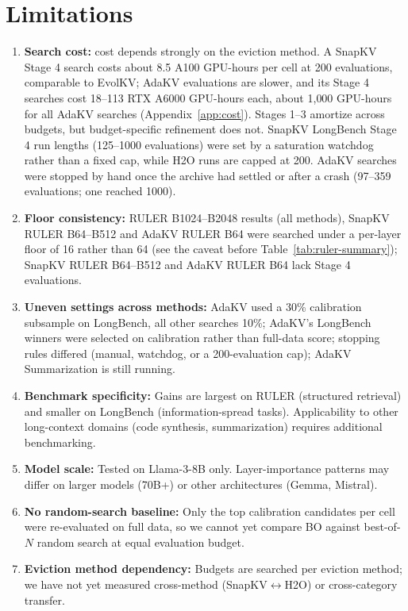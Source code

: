 \documentclass[11pt]{article}
\begin{document}
\section{Limitations}

\begin{enumerate}
\item \textbf{Search cost:} cost depends strongly on the eviction method. A SnapKV Stage 4 search costs about 8.5 A100 GPU-hours per cell at 200 evaluations, comparable to EvolKV; AdaKV evaluations are slower, and its Stage 4 searches cost 18--113 RTX A6000 GPU-hours each, about 1{,}000 GPU-hours for all AdaKV searches (Appendix~\ref{app:cost}). Stages 1--3 amortize across budgets, but budget-specific refinement does not. SnapKV LongBench Stage 4 run lengths (125--1000 evaluations) were set by a saturation watchdog rather than a fixed cap, while H2O runs are capped at 200. AdaKV searches were stopped by hand once the archive had settled or after a crash (97--359 evaluations; one reached 1000).
\item \textbf{Floor consistency:} RULER B1024--B2048 results (all methods), SnapKV RULER B64--B512 and AdaKV RULER B64 were searched under a per-layer floor of 16 rather than 64 (see the caveat before Table~\ref{tab:ruler-summary}); SnapKV RULER B64--B512 and AdaKV RULER B64 lack Stage 4 evaluations.
\item \textbf{Uneven settings across methods:} AdaKV used a 30\% calibration subsample on LongBench, all other searches 10\%; AdaKV's LongBench winners were selected on calibration rather than full-data score; stopping rules differed (manual, watchdog, or a 200-evaluation cap); AdaKV Summarization is still running.
\item \textbf{Benchmark specificity:} Gains are largest on RULER (structured retrieval) and smaller on LongBench (information-spread tasks). Applicability to other long-context domains (code synthesis, summarization) requires additional benchmarking.
\item \textbf{Model scale:} Tested on Llama-3-8B only. Layer-importance patterns may differ on larger models (70B+) or other architectures (Gemma, Mistral).
\item \textbf{No random-search baseline:} Only the top calibration candidates per cell were re-evaluated on full data, so we cannot yet compare BO against best-of-$N$ random search at equal evaluation budget.
\item \textbf{Eviction method dependency:} Budgets are searched per eviction method; we have not yet measured cross-method (SnapKV$\leftrightarrow$H2O) or cross-category transfer.
\end{enumerate}
\end{document}
